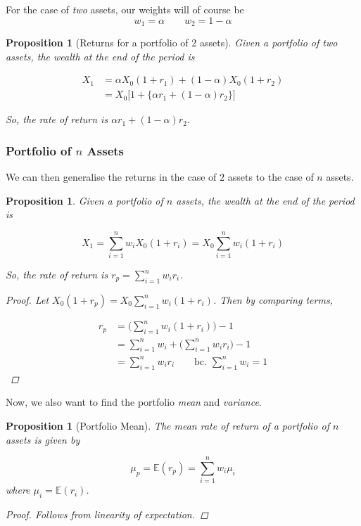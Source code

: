 \documentclass[12pt, a4paper]{article}
\theoremstyle{plain}
\newtheorem{proposition}[theorem]{Proposition}
\theoremstyle{definition}
\theoremstyle{remark}
\begin{document}
For the case of \textit{two} assets, our weights will of course be $$w_1 = \alpha \qquad w_2 = 1-\alpha$$

\begin{proposition}[Returns for a portfolio of 2 assets]

Given a portfolio of two assets, the wealth at the end of the period is

\begin{align*}
    X_1 &= \alpha X_0 (1+r_1) + (1-\alpha) X_0(1+r_2) \\ &=  X_0 \Big[1+ \Big\{\alpha r_1+ (1-\alpha)r_2 \Big\} \Big]
\end{align*}

So, the rate of return is $\alpha r_1 + (1-\alpha)r_2$.
    
\end{proposition}

\subsubsection{Portfolio of $n$ Assets}

We can then generalise the returns in the case of $2$ assets to the case of $n$ assets.

\begin{proposition}
    Given a portfolio of $n$ assets, the wealth at the end of the period is

$$
    X_1 = \sum_{i=1}^n w_iX_0 (1+r_i) = X_0 \sum_{i=1}^n w_i (1+r_i)
$$


So, the rate of return is $r_p = \sum_{i=1}^n w_i r_i$.

\begin{proof}
    Let $X_0(1+r_p) = X_0 \sum_{i=1}^n w_i(1+r_i)$. Then by comparing terms,

    \begin{align*}
        r_p &= \Bigg(\sum_{i=1}^n w_i(1+r_i) \Bigg) -1\\
        &=\sum_{i=1}^n w_i + \Bigg(\sum_{i=1}^n w_i r_i\Bigg) -1\\
        &= \sum_{i=1}^n w_i r_i \qquad \text{bc. }\sum_{i=1}^n w_i =1
    \end{align*}
\end{proof}
\end{proposition}

Now, we also want to find the portfolio \textit{mean} and \textit{variance}.

\begin{proposition}[Portfolio Mean]
The mean rate of return of a portfolio of $n$ assets is given by

$$\mu_p = \mathbb{E}(r_p) = \sum_{i=1}^n w_i\mu_i$$ where $\mu_i = \mathbb{E}(r_i)$.

\begin{proof}
    Follows from linearity of expectation.
\end{proof}
\end{proposition}
\end{document}
